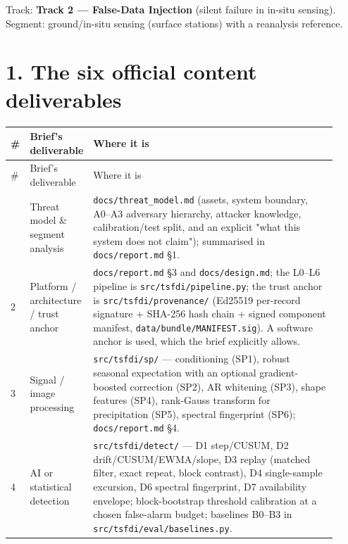 \documentclass[10pt,a4paper]{article}
\begin{document}
Track: \textbf{Track 2 — False-\allowbreak{}Data Injection} (silent failure in in-\allowbreak{}situ sensing). Segment: ground/\allowbreak{}in-\allowbreak{}situ sensing (surface stations) with a reanalysis reference.

\section*{1. The six official content deliverables}
{\small
\setlength{\tabcolsep}{4.5pt}
\setlength{\LTleft}{\fill}
\setlength{\LTright}{\fill}
\begin{longtable}{l>{\raggedright\arraybackslash}p{0.097\linewidth}>{\raggedright\arraybackslash}p{0.828\linewidth}}
\toprule
\# & Brief's deliverable & Where it is \\
\midrule
\endfirsthead
\toprule
\# & Brief's deliverable & Where it is \\
\midrule
\endhead
\bottomrule
\endlastfoot
1 & Threat model \& segment analysis & \texttt{docs/\allowbreak{}threat\_\allowbreak{}model.md} (assets, system boundary, A0–A3 adversary hierarchy, attacker knowledge, calibration/\allowbreak{}test split, and an explicit "what this system does not claim"); summarised in \texttt{docs/\allowbreak{}report.md} §1. \\
2 & Platform /\allowbreak{} architecture /\allowbreak{} trust anchor & \texttt{docs/\allowbreak{}report.md} §3 and \texttt{docs/\allowbreak{}design.md}; the L0–L6 pipeline is \texttt{src/\allowbreak{}tsfdi/\allowbreak{}pipeline.py}; the trust anchor is \texttt{src/\allowbreak{}tsfdi/\allowbreak{}provenance/\allowbreak{}} (Ed25519 per-\allowbreak{}record signature + SHA-\allowbreak{}256 hash chain + signed component manifest, \texttt{data/\allowbreak{}bundle/\allowbreak{}MANIFEST.sig}). A software anchor is used, which the brief explicitly allows. \\
3 & Signal /\allowbreak{} image processing & \texttt{src/\allowbreak{}tsfdi/\allowbreak{}sp/\allowbreak{}} — conditioning (SP1), robust seasonal expectation with an optional gradient-\allowbreak{}boosted correction (SP2), AR whitening (SP3), shape features (SP4), rank-\allowbreak{}Gauss transform for precipitation (SP5), spectral fingerprint (SP6); \texttt{docs/\allowbreak{}report.md} §4. \\
4 & AI or statistical detection & \texttt{src/\allowbreak{}tsfdi/\allowbreak{}detect/\allowbreak{}} — D1 step/\allowbreak{}CUSUM, D2 drift/\allowbreak{}CUSUM/\allowbreak{}EWMA/\allowbreak{}slope, D3 replay (matched filter, exact repeat, block contrast), D4 single-\allowbreak{}sample excursion, D6 spectral fingerprint, D7 availability envelope; block-\allowbreak{}bootstrap threshold calibration at a chosen false-\allowbreak{}alarm budget; baselines B0–B3 in \texttt{src/\allowbreak{}tsfdi/\allowbreak{}eval/\allowbreak{}baselines.py}. \\

\end{longtable}}
\end{document}
